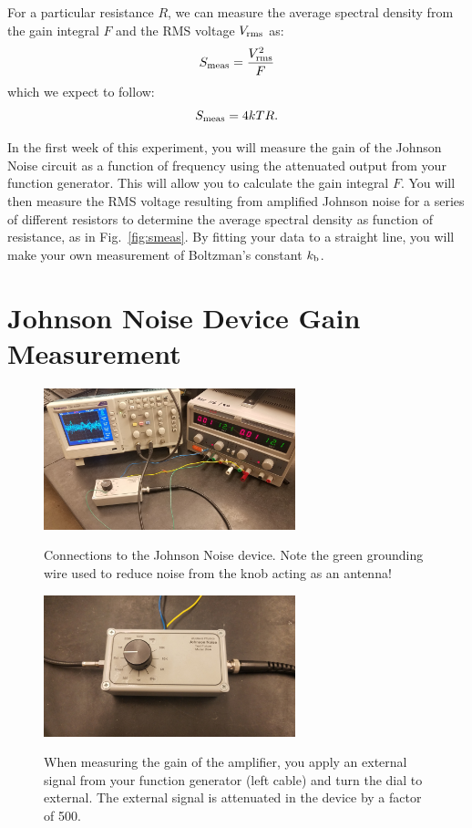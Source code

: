 \documentclass[12pt]{article}
\begin{document}
For a particular resistance $R$, we can measure the average spectral density from the gain integral $F$ and the RMS voltage $V_{\rm rms}$ as:
\begin{displaymath}
S_{\rm meas} = \frac{V^2_{\rm rms}}{F}
\end{displaymath}
which we expect to follow:
\begin{displaymath}
S_{\rm meas} = 4 k T R.
\end{displaymath}

In the first week of this experiment, you will measure the gain of the Johnson Noise circuit as a function of frequency using the attenuated output from your function generator.   This will allow you to calculate the gain integral $F$.  You will then measure the RMS voltage resulting from amplified Johnson noise for a series of different resistors to determine the average spectral density as function of resistance, as in Fig.~\ref{fig:smeas}.  By fitting your data to a straight line, you will make your own measurement of Boltzman's constant $k_{\rm b}$.

\section{Johnson Noise Device Gain Measurement}

\begin{figure}[htbp]
\begin{center}
{\includegraphics[width=0.65\textwidth]{figs/setup.jpg}}
\end{center}
\caption{\label{fig:plan} Connections to the Johnson Noise device.  Note the green grounding wire used to reduce noise from the knob acting as an antenna!}
\end{figure}

\begin{figure}[htbp]
\begin{center}
{\includegraphics[width=0.65\textwidth]{figs/gain.jpg}}
\end{center}
\caption{\label{fig:plan} When measuring the gain of the amplifier, you apply an external signal from your function generator (left cable) and turn the dial to external.   The external signal is attenuated in the device by a factor of 500. }
\end{figure}
\end{document}
